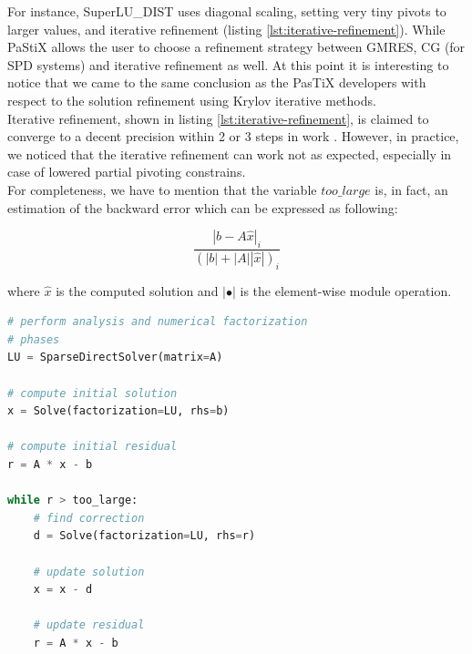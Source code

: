 For instance, SuperLU\_DIST uses diagonal scaling, setting very tiny pivots to larger values, and iterative refinement (listing \ref{lst:iterative-refinement}). While PaStiX allows the user to choose a refinement strategy between GMRES, CG (for SPD systems) and iterative refinement as well. At this point it is interesting to notice that we came to the same conclusion as the PasTiX developers with respect to the solution refinement using Krylov iterative methods.\\


Iterative refinement, shown in listing \ref{lst:iterative-refinement}, is claimed to converge to a  decent precision within 2 or 3 steps in work \cite{mm-backward-error}. However, in practice, we noticed that the iterative refinement can work not as expected, especially in case of lowered partial pivoting constrains.\\

For completeness, we have to mention that the variable $too\_large$ is, in fact, an estimation of the backward error \cite{mm-backward-error} which can be expressed as following:

\begin{equation}
\frac{|b - A\hat{x}|_{i}}{(|b| + |A| |\hat{x}|)_{i}}
\end{equation}

where $\hat{x}$ is the computed solution and $|\bullet|$ is the element-wise module operation.\\

 
\begin{minipage}{\linewidth}

\begin{lstlisting}[language=python, caption={A simple iterative refinement}, frame=single, label={lst:iterative-refinement}]
# perform analysis and numerical factorization 
# phases
LU = SparseDirectSolver(matrix=A)

# compute initial solution
x = Solve(factorization=LU, rhs=b)

# compute initial residual
r = A * x - b

while r > too_large:
	# find correction
	d = Solve(factorization=LU, rhs=r)
	
	# update solution
	x = x - d
	
	# update residual
	r = A * x - b
\end{lstlisting}
\end{minipage}


